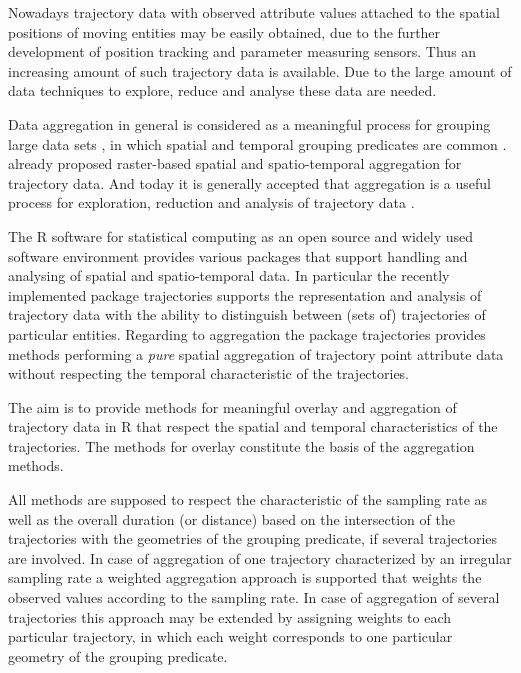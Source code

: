 \documentclass[12pt, oneside, a4paper]{scrbook}
\newcommand{\pkg}[1]{{\normalfont\fontseries{b}\selectfont #1}}
\let\proglang=\textsf
\begin{document}
Nowadays trajectory data with observed attribute values attached to the spatial positions of moving entities may be easily obtained, due to the further development of position tracking and parameter measuring sensors.
Thus an increasing amount of such trajectory data is available.
Due to the large amount of data techniques to explore, reduce and analyse these data are needed.
\par\medskip

Data aggregation in general is considered as a meaningful process for grouping large data sets \citep{goldstein_using_1994}, 
in which spatial and temporal grouping predicates are common \citep{fredrikson_temporal_1999}. 
\citet{meratnia_aggregation_2002} already proposed raster-based spatial and spatio-temporal aggregation for trajectory data.
And today it is generally accepted that aggregation is a useful process for exploration, reduction and analysis of trajectory data \citep{andrienko_exploratory_2003, giannotti_trajectory_2007, andrienko_spatial_2011}.
\par\medskip

The \proglang{R} software for statistical computing \citep{r_development_core_team_r:_2014} as an open source and widely used software environment provides various packages that support handling and analysing of spatial and spatio-temporal data.
In particular the recently implemented package \pkg{trajectories} \citep{pebesma_trajectories:_2014} supports the representation and analysis of trajectory data with the ability to distinguish between (sets of) trajectories of particular entities.
Regarding to aggregation the package \pkg{trajectories} provides methods performing a \textit{pure} spatial aggregation of trajectory point attribute data without respecting the temporal characteristic of the trajectories.
\par\medskip

The aim is to provide methods for meaningful overlay and aggregation of trajectory data in \proglang{R} that respect the spatial and temporal characteristics of the trajectories. The methods for overlay constitute the basis of the aggregation methods.

All methods are supposed to respect the characteristic of the sampling rate as well as the overall duration (or distance) based on the intersection of the trajectories with the geometries of the grouping predicate,
if several trajectories are involved.
In case of aggregation of one trajectory characterized by an irregular sampling rate a weighted aggregation approach is supported that weights the observed values according to the sampling rate.
In case of aggregation of several trajectories this approach may be extended by assigning weights to each particular trajectory, in which each weight corresponds to one particular geometry of the grouping predicate.
\end{document}

